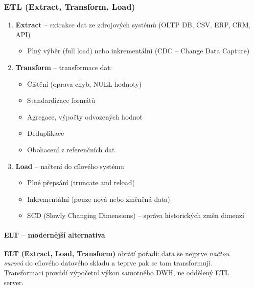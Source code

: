 \subsubsection{ETL (Extract, Transform, Load)}

\begin{enumerate}
  \item \textbf{Extract} -- extrakce dat ze zdrojových systémů (OLTP DB, CSV, ERP, CRM, API)
    \begin{itemize}
      \item Plný výběr (full load) nebo inkrementální (CDC -- Change Data Capture)
    \end{itemize}
  \item \textbf{Transform} -- transformace dat:
    \begin{itemize}
      \item Čištění (oprava chyb, NULL hodnoty)
      \item Standardizace formátů
      \item Agregace, výpočty odvozených hodnot
      \item Deduplikace
      \item Obohacení z referenčních dat
    \end{itemize}
  \item \textbf{Load} -- načtení do cílového systému
    \begin{itemize}
      \item Plné přepsání (truncate and reload)
      \item Inkrementální (pouze nová nebo změněná data)
      \item SCD (Slowly Changing Dimensions) -- správa historických změn dimenzí
    \end{itemize}
\end{enumerate}

\paragraph{ELT -- modernější alternativa}

\textbf{ELT (Extract, Load, Transform)} obrátí pořadí: data se nejprve \textit{načtou surová} do cílového
datového skladu a teprve pak se tam transformují. Transformaci provádí výpočetní výkon samotného DWH,
ne oddělený ETL server.

